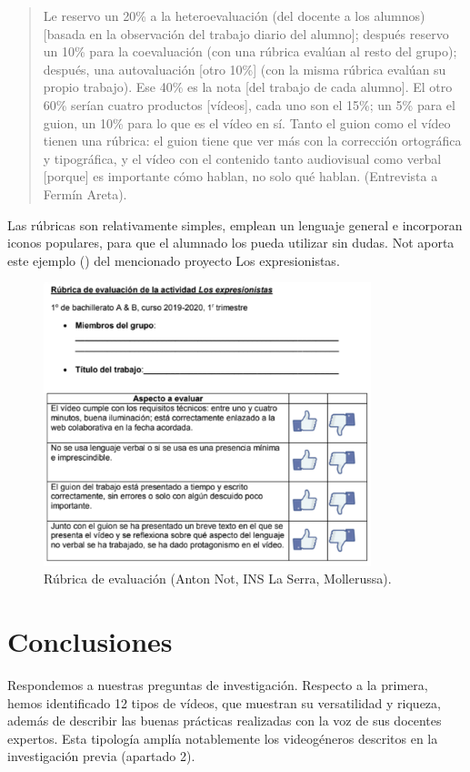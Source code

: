 \documentclass[spanish]{textolivre}
\begin{document}
\begin{quote}
 Le reservo un 20\% a la heteroevaluación (del docente a los alumnos) [basada en la observación del trabajo diario del alumno]; después reservo un 10\% para la coevaluación (con una rúbrica evalúan al resto del grupo); después, una autovaluación [otro 10\%] (con la misma rúbrica evalúan su propio trabajo). Ese 40\% es la nota [del trabajo de cada alumno]. El otro 60\% serían cuatro productos [vídeos], cada uno son el 15\%; un 5\% para el guion, un 10\% para lo que es el vídeo en sí. Tanto el guion como el vídeo tienen una rúbrica: el guion tiene que ver más con la corrección ortográfica y tipográfica, y el vídeo con el contenido tanto audiovisual como verbal [porque] es importante cómo hablan, no solo qué hablan. (Entrevista a Fermín Areta).
\end{quote}

Las rúbricas son relativamente simples, emplean un lenguaje general e incorporan iconos populares, para que el alumnado los pueda utilizar sin dudas. Not aporta este ejemplo () del mencionado proyecto Los expresionistas.

\begin{figure}[htbp]
 \centering
 \includegraphics[width=0.85\textwidth]{Fig10.png}
 \caption{Rúbrica de evaluación (Anton Not, INS La Serra, Mollerussa).}
 \label{fig09}
\end{figure}

\section{Conclusiones}\label{sec-format-simple}
Respondemos a nuestras preguntas de investigación. Respecto a la primera, hemos identificado 12 tipos de vídeos, que muestran su versatilidad y riqueza, además de describir las buenas prácticas realizadas con la voz de sus docentes expertos. Esta tipología amplía notablemente los videogéneros descritos en la investigación previa (apartado 2).
\end{document}
